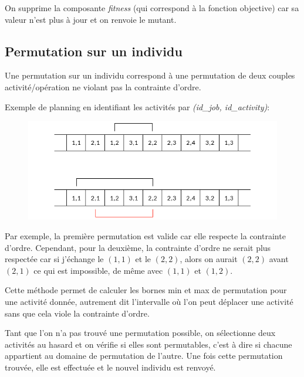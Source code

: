 On supprime la composante \textit{fitness} (qui correspond à la fonction objective) car sa valeur n'est plus à jour et on renvoie le mutant.

\subsection{Permutation sur un individu}

Une permutation sur un individu correspond à une permutation de deux couples activité/opération ne violant pas la contrainte d'ordre. 

Exemple de planning en identifiant les activités par \textit{(id\_job, id\_activity)}:

\begin{figure}[!h]
    \centering
    \includegraphics[scale=0.8]{report/Pictures/permutation.png}
\end{figure}

Par exemple, la première permutation est valide car elle respecte la contrainte d'ordre. Cependant, pour la deuxième, la contrainte d'ordre ne serait plus respectée car si j'échange le $(1,1)$ et le $(2,2)$, alors on aurait $(2,2)$ avant $(2,1)$ ce qui est impossible, de même avec $(1,1)$ et $(1,2)$. 



Cette méthode permet de calculer les bornes min et max de permutation pour une activité donnée, autrement dit l'intervalle où l'on peut déplacer une activité sans que cela viole la contrainte d'ordre.

\newpage



Tant que l'on n'a pas trouvé une permutation possible, on sélectionne deux activités au hasard et on vérifie si elles sont permutables, c'est à dire si chacune appartient au domaine de permutation de l'autre. Une fois cette permutation trouvée, elle est effectuée et le nouvel individu est renvoyé.

